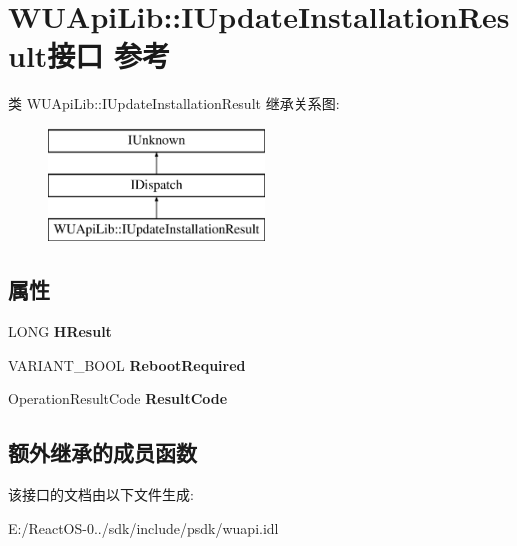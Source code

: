 \hypertarget{interface_w_u_api_lib_1_1_i_update_installation_result}{}\section{W\+U\+Api\+Lib\+:\+:I\+Update\+Installation\+Result接口 参考}
\label{interface_w_u_api_lib_1_1_i_update_installation_result}
类 W\+U\+Api\+Lib\+:\+:I\+Update\+Installation\+Result 继承关系图\+:\begin{figure}[H]
\begin{center}
\leavevmode
\includegraphics[height=3.000000cm]{interface_w_u_api_lib_1_1_i_update_installation_result}
\end{center}
\end{figure}
\subsection*{属性}
\begin{DoxyCompactItemize}
\item 
\mbox{\label{interface_w_u_api_lib_1_1_i_update_installation_result_aa517d62ba2cd5967f3b071cfd3d91295}} 
L\+O\+NG {\bfseries H\+Result}
\item 
\mbox{\label{interface_w_u_api_lib_1_1_i_update_installation_result_aa1a09a73c3d5b2afe5badd5574f06fde}} 
V\+A\+R\+I\+A\+N\+T\+\_\+\+B\+O\+OL {\bfseries Reboot\+Required}
\item 
\mbox{\label{interface_w_u_api_lib_1_1_i_update_installation_result_ae5aea6cf258ff4ad7a2bac57f06e5d22}} 
Operation\+Result\+Code {\bfseries Result\+Code}
\end{DoxyCompactItemize}
\subsection*{额外继承的成员函数}


该接口的文档由以下文件生成\+:\begin{DoxyCompactItemize}
\item 
E\+:/\+React\+O\+S-\/0../sdk/include/psdk/wuapi.\+idl\end{DoxyCompactItemize}
